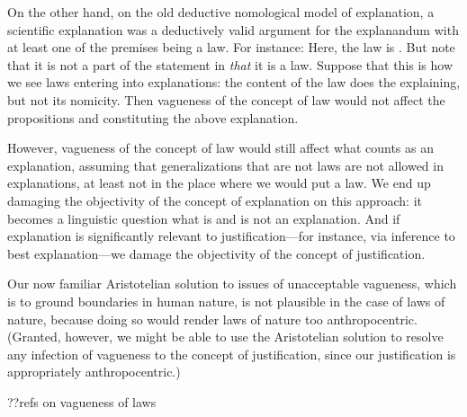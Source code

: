 On the other hand, on the old deductive nomological
model of explanation, a scientific explanation was a deductively valid argument for the explanandum with at least one of the premises
being a law. For instance:
Here, the law is . But note that it is not a part of the statement in  \textit{that} it is a law. 
Suppose that this is how we see laws entering into explanations: the content of the law does the explaining, but not
its nomicity. Then vagueness of the concept of law would not affect the propositions  and  constituting the
above explanation.  

However, vagueness of the concept of law would still affect what counts as an explanation, assuming that generalizations that
are not laws are not allowed in explanations, at least not in the place where we would put a law. We end up damaging the
objectivity of the concept of explanation on this approach: it becomes a linguistic question what is and is not an explanation. 
And if explanation is significantly relevant to justification---for instance, via inference to best explanation---we damage the 
objectivity of the concept of justification.

Our now familiar Aristotelian solution to issues of unacceptable vagueness, which is to ground boundaries in human nature,
is not plausible in the case of laws of nature, because doing so would render laws of nature too anthropocentric. (Granted,
however, we might be able to use the Aristotelian solution to resolve any infection of vagueness to the concept of justification,
since our justification is appropriately anthropocentric.)

??refs on vagueness of laws


